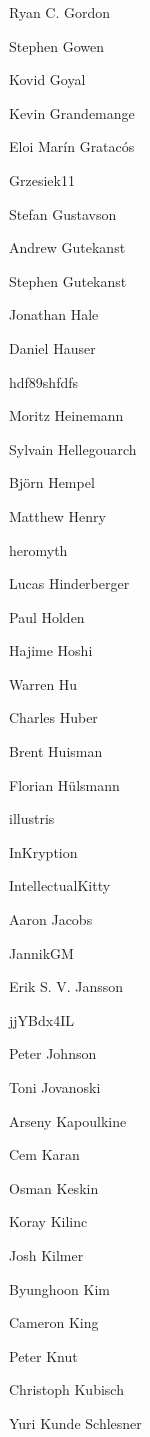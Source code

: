 \begin{DoxyItemize}
\item Ryan C. Gordon
\item Stephen Gowen
\item Kovid Goyal
\item Kevin Grandemange
\item Eloi Marín Gratacós
\item Grzesiek11
\item Stefan Gustavson
\item Andrew Gutekanst
\item Stephen Gutekanst
\item Jonathan Hale
\item Daniel Hauser
\item hdf89shfdfs
\item Moritz Heinemann
\item Sylvain Hellegouarch
\item Björn Hempel
\item Matthew Henry
\item heromyth
\item Lucas Hinderberger
\item Paul Holden
\item Hajime Hoshi
\item Warren Hu
\item Charles Huber
\item Brent Huisman
\item Florian Hülsmann
\item illustris
\item In\+Kryption
\item Intellectual\+Kitty
\item Aaron Jacobs
\item Jannik\+GM
\item Erik S. V. Jansson
\item jj\+YBdx4\+IL
\item Peter Johnson
\item Toni Jovanoski
\item Arseny Kapoulkine
\item Cem Karan
\item Osman Keskin
\item Koray Kilinc
\item Josh Kilmer
\item Byunghoon Kim
\item Cameron King
\item Peter Knut
\item Christoph Kubisch
\item Yuri Kunde Schlesner

\end{DoxyItemize}
